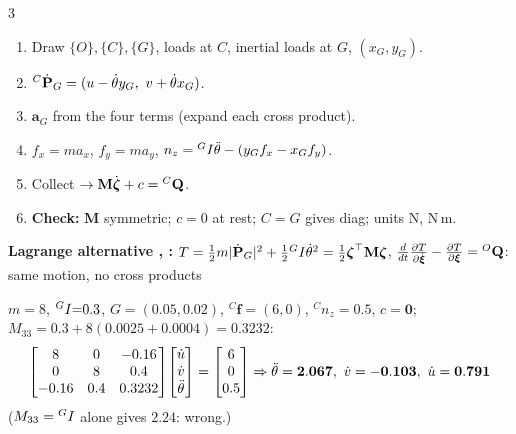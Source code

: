 \begin{multicols}{3}
\begin{recipe}
\begin{enumerate}
\item Draw $\{O\},\{C\},\{G\}$, loads at $C$, inertial loads at $G$, $(x_G,y_G)$.
\item ${}^C\dot{\mathbf P}_G=(u-\wEth y_G,\ v+\wEth x_G)$.
\item $\mathbf a_G$ from the four terms (expand each cross product).
\item $f_x=ma_x$, $f_y=ma_y$, $n_z={}^{G}I\ddot\theta-(y_Gf_x-x_Gf_y)$.
\item Collect $\to\mathbf M\dot{\boldsymbol\zeta}+c={}^{C}\mathbf Q$.
\item \textbf{Check:} $\mathbf M$ symmetric; $c=0$ at rest; $C=G$ gives diag; units N, N\,m.
\end{enumerate}
\end{recipe}
\textbf{Lagrange alternative , \added:} $T=\tfrac12m|\dot{\mathbf P}_G|^2+\tfrac12{}^{G}I\dot\theta^2=\tfrac12\boldsymbol\zeta^\top\mathbf M\boldsymbol\zeta$, $\tfrac{d}{dt}\tfrac{\partial T}{\partial\dot{\boldsymbol\xi}}-\tfrac{\partial T}{\partial\boldsymbol\xi}={}^{O}\mathbf Q$: same motion, no cross products \chk
\begin{worked}
$m{=}8$, ${}^{G}I{=}0.3$, $G{=}(0.05,0.02)$, ${}^C\mathbf f{=}(6,0)$, ${}^Cn_z{=}0.5$, $c{=}\mathbf 0$; $M_{33}=0.3+8(0.0025+0.0004)=0.3232$:
\[\begin{bmatrix}8&0&-0.16\\0&8&0.4\\-0.16&0.4&0.3232\end{bmatrix}\!\begin{bmatrix}\dot u\\\dot v\\\wEthh\end{bmatrix}=\begin{bmatrix}6\\0\\0.5\end{bmatrix}\Rightarrow\wEthh=\mathbf{2.067},\ \dot v=\mathbf{-0.103},\ \dot u=\mathbf{0.791}\]
($M_{33}={}^{G}I$ alone gives $2.24$: wrong.) \chk
\end{worked}


\end{multicols}
